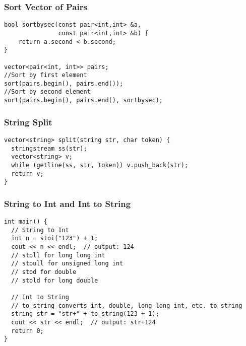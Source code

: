\documentclass[twoside]{article}
\begin{document}
\begin{multicols*}{2}
{\subsubsection*{Sort Vector of Pairs}
}
\begin{verbatim}
bool sortbysec(const pair<int,int> &a, 
               const pair<int,int> &b) {
    return a.second < b.second; 
}

vector<pair<int, int>> pairs;
//Sort by first element
sort(pairs.begin(), pairs.end());
//Sort by second element
sort(pairs.begin(), pairs.end(), sortbysec);
\end{verbatim}

{
\subsubsection*{String Split}
}
\begin{verbatim}
vector<string> split(string str, char token) {
  stringstream ss(str);
  vector<string> v;
  while (getline(ss, str, token)) v.push_back(str);
  return v;
}
\end{verbatim}

{
\subsubsection*{String to Int and Int to String}
}
\begin{verbatim}
int main() {
  // String to Int
  int n = stoi("123") + 1;
  cout << n << endl;  // output: 124
  // stoll for long long int
  // stoull for unsigned long int
  // stod for double
  // stold for long double
  
  // Int to String
  // to_string converts int, double, long long int, etc. to string
  string str = "str+" + to_string(123 + 1);
  cout << str << endl;  // output: str+124
  return 0;
}


\end{verbatim}
\end{multicols*}
\end{document}
